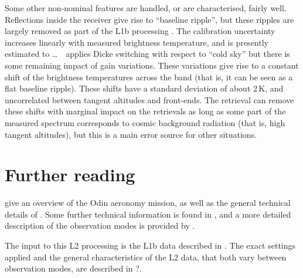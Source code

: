 Some other non-nominal features are handled, or are characterised, fairly well.
Reflections inside the receiver give rise to ``baseline ripple'', but these
ripples are largely removed as part of the L1b processing \citep{atbdl1b}. The
calibration uncertainty increases linearly with measured brightness
temperature, and is presently estimated to \dots{}\ \smr\
applies Dicke switching with respect to ``cold sky'' but there is some
remaining impact of gain variations. These variations give rise to a constant
shift of the brightness temperatures across the band (that is, it can be seen
as a flat baseline ripple). These shifts have a standard deviation of about
2\,K, and uncorrelated between tangent altitudes and front-ends. The
retrieval can remove these shifts with marginal impact on the retrievals as
long as some part of the measured spectrum corresponds to cosmic background
radiation (that is, high tangent altitudes), but this is a main error source
for other situations.



\section{Further reading}
\label{sec:reading}
%
\citet{murtagh:anove:02} give an overview of the Odin aeronomy mission, as well
as the general technical details of \smr. Some further technical information
is found in \citet{eriksson:studi:02}, and a more detailed description of
the observation modes is provided by \citet{merino:studi:02}.

The input to this L2 processing is the L1b data described in \citet{atbdl1b}. The
exact settings applied and the general characteristics of the L2 data, that
both vary between observation modes, are described in ?\todo{This document
  does not yet exist}.




